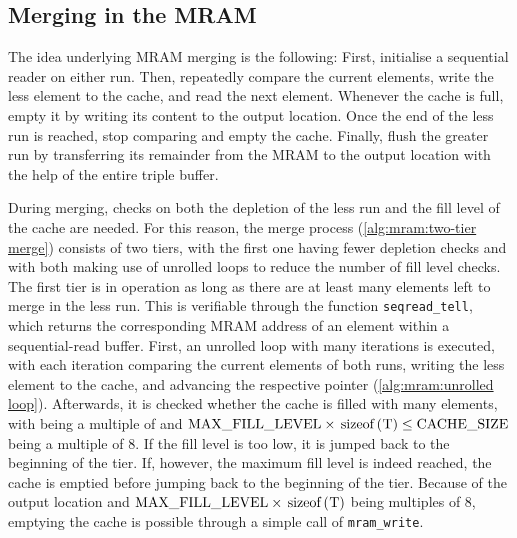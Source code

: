 \subsection{Merging in the MRAM}
\label{sec:mram:merge:presentation}

The idea underlying MRAM merging is the following:
First, initialise a sequential reader on either run.
Then, repeatedly compare the current elements, write the less element to the cache, and read the next element.
Whenever the cache is full, empty it by writing its content to the output location.
Once the end of the less run is reached, stop comparing and empty the cache.
Finally, flush the greater run by transferring its remainder from the MRAM to the output location with the help of the entire triple buffer.

During merging, checks on both the depletion of the less run and the fill level of the cache are needed.
For this reason, the merge process (\cref{alg:mram:two-tier merge}) consists of two tiers, with the first one having fewer depletion checks and with both making use of unrolled loops to reduce the number of fill level checks.
The first tier is in operation as long as there are at least \unrollfactor{} many elements left to merge in the less run.
This is verifiable through the function \lstinline|seqread_tell|, which returns the corresponding MRAM address of an element within a sequential-read buffer.
First, an unrolled loop with \unrollfactor{} many iterations is executed, with each iteration comparing the current elements of both runs, writing the less element to the cache, and advancing the respective pointer (\cref{alg:mram:unrolled loop}).
Afterwards, it is checked whether the cache is filled with \unrolledcachelength{} many elements, with \unrolledcachelength{} being a multiple of \unrollfactor{} and \(\unrolledcachelength{} \times \text{\lstinline[keywords={}]|sizeof(T)|} \le \cachesize{}\) being a multiple of 8.
If the fill level is too low, it is jumped back to the beginning of the tier.
If, however, the maximum fill level is indeed reached, the cache is emptied before jumping back to the beginning of the tier.
Because of the output location and \(\unrolledcachelength{} \times \text{\lstinline[keywords={}]|sizeof(T)|}\) being multiples of 8, emptying the cache is possible through a simple call of \lstinline|mram_write|.


